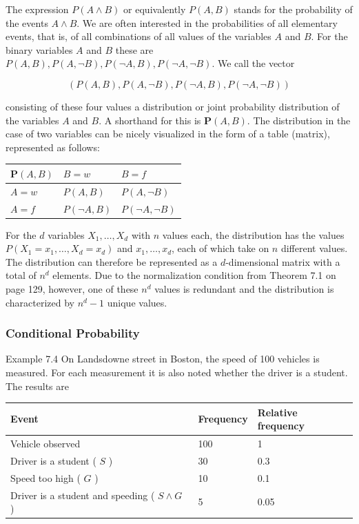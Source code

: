 \documentclass[10pt]{article}
\begin{document}
The expression $P(A \wedge B)$ or equivalently $P(A, B)$ stands for the probability of the events $A \wedge B$. We are often interested in the probabilities of all elementary events, that is, of all combinations of all values of the variables $A$ and $B$. For the binary variables $A$ and $B$ these are $P(A, B), P(A, \neg B), P(\neg A, B), P(\neg A, \neg B)$. We call the vector

$$
(P(A, B), P(A, \neg B), P(\neg A, B), P(\neg A, \neg B))
$$

consisting of these four values a distribution or joint probability distribution of the variables $A$ and $B$. A shorthand for this is $\boldsymbol{P}(A, B)$. The distribution in the case of two variables can be nicely visualized in the form of a table (matrix), represented as follows:

\begin{center}
\begin{tabular}{lll}
$\boldsymbol{P}(A, B)$ & $B=w$ & $B=f$ \\
\hline
$A=w$ & $P(A, B)$ & $P(A, \neg B)$ \\
\hline
$A=f$ & $P(\neg A, B)$ & $P(\neg A, \neg B)$ \\
\hline
\end{tabular}
\end{center}

For the $d$ variables $X_{1}, \ldots, X_{d}$ with $n$ values each, the distribution has the values $P\left(X_{1}=x_{1}, \ldots, X_{d}=x_{d}\right)$ and $x_{1}, \ldots, x_{d}$, each of which take on $n$ different values. The distribution can therefore be represented as a $d$-dimensional matrix with a total of $n^{d}$ elements. Due to the normalization condition from Theorem 7.1 on page 129, however, one of these $n^{d}$ values is redundant and the distribution is characterized by $n^{d}-1$ unique values.

\subsubsection*{Conditional Probability}
Example 7.4 On Landsdowne street in Boston, the speed of 100 vehicles is measured. For each measurement it is also noted whether the driver is a student. The results are

\begin{center}
\begin{tabular}{|l|l|l|}
\hline
Event & Frequency & Relative frequency \\
\hline
Vehicle observed & 100 & 1 \\
\hline
Driver is a student ( $S$ ) & 30 & 0.3 \\
\hline
Speed too high ( $G$ ) & 10 & 0.1 \\
\hline
Driver is a student and speeding ( $S \wedge G$ ) & 5 & 0.05 \\
\hline
\end{tabular}
\end{center}
\end{document}
